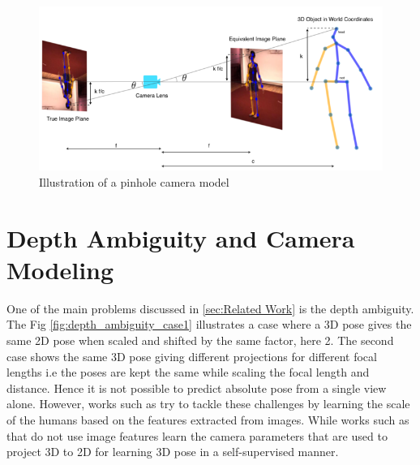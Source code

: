 \begin{figure}[h]
    \centering
    \includegraphics[width=\textwidth]{figures/background/pinhole.png}
    \caption{Illustration of a pinhole camera model}
    \label{fig:pinhole}
\end{figure}

\section{Depth Ambiguity and Camera Modeling}
\label{sec:depth_ambiguity_camera_modeling}
One of the main problems discussed in \ref{sec:Related Work} is the depth ambiguity. The Fig \ref{fig:depth_ambiguity_case1} illustrates a case where a 3D pose gives the same 2D pose when scaled and shifted by the same factor, here 2. The second case shows the same 3D pose giving different projections for different focal lengths i.e the poses are kept the same while scaling the focal length and distance. Hence it is not possible to predict absolute pose from a single view alone. However, works such as \cite{CameraDistanceAware} try to tackle these challenges by learning the scale of the humans based on the features extracted from images. While works such as \cite{repnet,weaklymultiple} that do not use image features learn the camera parameters that are used to project 3D to 2D for learning 3D pose in a self-supervised manner. 

